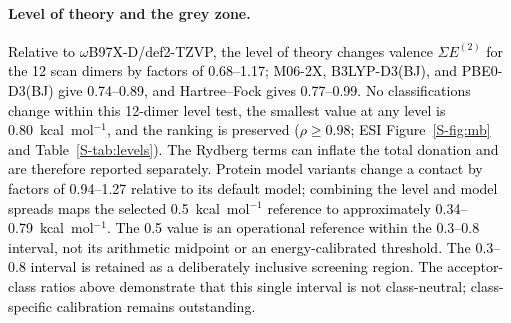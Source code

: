\documentclass[journal=jcisd8,manuscript=article,layout=two-column]{achemso}
\newcommand{\tcb}[1]{{\textcolor{black}{#1}}}
\newcommand{\ET}{E^{(2)}}
\newcommand{\kcal}{kcal\,mol$^{-1}$}
\begin{document}
\paragraph{Level of theory and the grey zone.}
\tcb{Relative to $\omega$B97X-D/def2-TZVP, the level of theory changes valence $\Sigma E^{(2)}$ for the 12 scan dimers by factors of 0.68--1.17; M06-2X, B3LYP-D3(BJ), and PBE0-D3(BJ) give 0.74--0.89, and Hartree--Fock gives 0.77--0.99. No classifications change within this 12-dimer level test, the smallest value at any level is 0.80~kcal~mol$^{-1}$, and the ranking is preserved ($\rho\geq0.98$; ESI Figure~\ref{S-fig:mb} and Table~\ref{S-tab:levels}). The Rydberg terms can inflate the total donation and are therefore reported separately. Protein model variants change a contact by factors of 0.94--1.27 relative to its default model; combining the level and model spreads maps the selected 0.5~kcal~mol$^{-1}$ reference to approximately 0.34--0.79~kcal~mol$^{-1}$. The 0.5 value is an operational reference within the 0.3--0.8 interval, not its arithmetic midpoint or an energy-calibrated threshold. The 0.3--0.8 interval is retained as a deliberately inclusive screening region. The acceptor-class ratios above demonstrate that this single interval is not class-neutral; class-specific calibration remains outstanding.}
\end{document}
